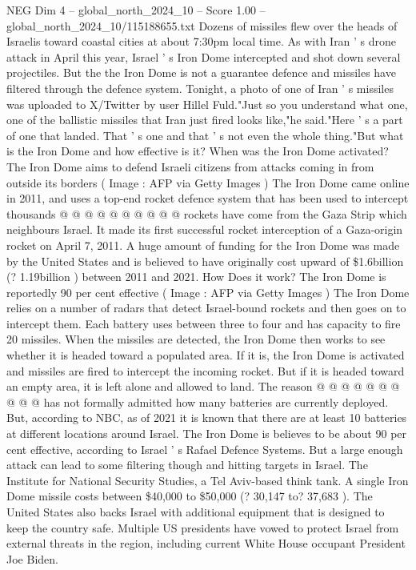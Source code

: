 \begin{textsample}{NEG Dim 4 – global\_north\_2024\_10 – Score 1.00 – global\_north\_2024\_10/115188655.txt}  \label{ex:f4_neg_055}
Dozens of missiles flew over the heads of Israelis toward coastal cities at about 7:30pm local time.
As with Iran ' s drone attack in April this year, Israel ' s Iron Dome intercepted and shot down several projectiles.
But the the Iron Dome is not a guarantee defence and missiles have filtered through the defence system.
Tonight, a photo of one of Iran ' s missiles was uploaded to X/Twitter by user Hillel Fuld."Just so you understand what one, one of the ballistic missiles that Iran just fired looks like,"he said."Here ' s a part of one that landed.
That ' s one and that ' s not even the whole thing."But what is the Iron Dome and how effective is it?
When was the Iron Dome activated?
The Iron Dome aims to defend Israeli citizens from attacks coming in from outside its borders ( Image : AFP via Getty Images ) The Iron Dome came online in 2011, and uses a top-end rocket defence system that has been used to intercept thousands @ @ @ @ @ @ @ @ @ @ rockets have come from the Gaza Strip which neighbours Israel.
It made its first successful rocket interception of a Gaza-origin rocket on April 7, 2011.
A huge amount of funding for the Iron Dome was made by the United States and is believed to have originally cost upward of \$1.6billion (? 1.19billion ) between 2011 and 2021.
How Does it work?
The Iron Dome is reportedly 90 per cent effective ( Image : AFP via Getty Images ) The Iron Dome relies on a number of radars that detect Israel-bound rockets and then goes on to intercept them.
Each battery uses between three to four and has capacity to fire 20 missiles.
When the missiles are detected, the Iron Dome then works to see whether it is headed toward a populated area.
If it is, the Iron Dome is activated and missiles are fired to intercept the incoming rocket.
But if it is headed toward an empty area, it is left alone and allowed to land.
The reason @ @ @ @ @ @ @ @ @ @ has not formally admitted how many batteries are currently deployed.
But, according to NBC, as of 2021 it is known that there are at least 10 batteries at different locations around Israel.
The Iron Dome is believes to be about 90 per cent effective, according to Israel ' s Rafael Defence Systems.
But a large enough attack can lead to some filtering though and hitting targets in Israel.
The Institute for National Security Studies, a Tel Aviv-based think tank.
A single Iron Dome missile costs between \$40,000 to \$50,000 (? 30,147 to? 37,683 ).
The United States also backs Israel with additional equipment that is designed to keep the country safe.
Multiple US presidents have vowed to protect Israel from external threats in the region, including current White House occupant President Joe Biden.

\end{textsample}
